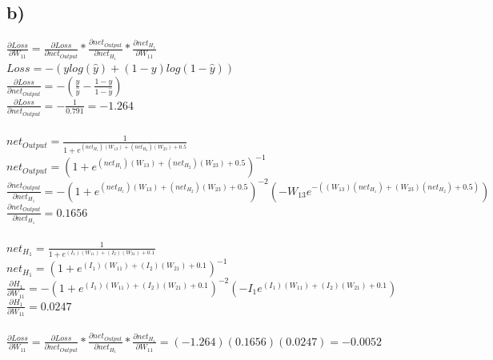 \documentclass[12pt, letterpaper]{article}
\begin{document}
\subsection*{b)} $\frac{\partial{Loss}}{\partial{W_{11}}} = \frac{\partial{Loss}}{\partial{net_{Output}}} * \frac{\partial{net_{Output}}}{\partial{net_{H_1}}} * \frac{\partial{net_{H_1}}}{\partial{W_{11}}}$\\
$Loss = -(ylog(\hat{y}) + (1-y)log(1-\hat{y}))$\\
$\frac{\partial{Loss}}{\partial{net_{Output}}} = -(\frac{y}{\hat{y}} - \frac{1-y}{1-\hat{y}})$\\
$\frac{\partial{Loss}}{\partial{net_{Output}}} = -\frac{1}{0.791} = -1.264$\\\\
$net_{Output} = \frac{1}{1+e^{(net_{H_1})(W_{13}) + (net_{H_2})(W_{23}) + 0.5}}$\\
$net_{Output} = (1+e^{(net_{H_1})(W_{13}) + (net_{H_2})(W_{23}) + 0.5})^{-1}$\\
$\frac{\partial{net_{Output}}}{\partial{net_{H_1}}} = -(1+e^{(net_{H_1})(W_{13}) + (net_{H_2})(W_{23}) + 0.5})^{-2}(-W_{13}e^{-((W_{13})(net_{H_1})+(W_{23})(net_{H_2})+0.5)})$\\
$\frac{\partial{net_{Output}}}{\partial{net_{H_1}}} = 0.1656$\\\\
$net_{H_1} = \frac{1}{1+e^{(I_1)(W_{11}) + (I_2)(W_{21}) + 0.1}}$\\
$net_{H_1} = (1+e^{(I_1)(W_{11}) + (I_2)(W_{21}) + 0.1})^{-1}$\\
$\frac{\partial{H_1}}{\partial{W_{11}}} = -(1+e^{(I_1)(W_{11}) + (I_2)(W_{21}) + 0.1})^{-2}(-I_1e^{(I_1)(W_{11}) + (I_2)(W_{21}) + 0.1})$\\
$\frac{\partial{H_1}}{\partial{W_{11}}} = 0.0247$\\\\
$\frac{\partial{Loss}}{\partial{W_{11}}} = \frac{\partial{Loss}}{\partial{net_{Output}}} * \frac{\partial{net_{Output}}}{\partial{net_{H_1}}} * \frac{\partial{net_{H_1}}}{\partial{W_{11}}} = (-1.264)(0.1656)(0.0247) = -0.0052$
\end{document}

